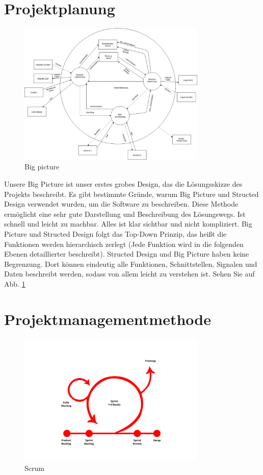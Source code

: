 \section{Projektplanung}
\begin{figure}[H]
	\includegraphics[width=0.8\textwidth]{./figures/Big_Picture.jpg}
	\centering
	\caption{Big picture}
	\label{fig:bigpicture}
\end{figure}
Unsere Big Picture ist unser erstes grobes Design, das die Lösungsskizze des Projekts beschreibt. Es gibt bestimmte Gründe, warum Big Picture und Structed Design verwendet wurden, um die Software zu beschreiben. Diese Methode ermöglicht eine sehr gute Darstellung und Beschreibung des Lösungswegs. Ist schnell und leicht zu machbar. Alles ist klar sichtbar und nicht kompliziert. Big Picture und Structed Design folgt das Top-Down Prinzip, das heißt die Funktionen werden hierarchisch zerlegt (Jede Funktion wird in die folgenden Ebenen detaillierter beschreibt). Structed Design und Big Picture haben keine Begrenzung. Dort können eindeutig alle Funktionen, Schnittstellen, Signalen und Daten beschreibt werden, sodass von allem leicht zu verstehen ist. Sehen Sie auf Abb. \ref{fig:bigpicture}
	
\section{Projektmanagementmethode}
\begin{figure}[H]
	\includegraphics[width=0.8\textwidth]{./figures/scrum.jpg}
	\centering
	\caption{Scrum}
	\label{fig:scrum}
\end{figure}

